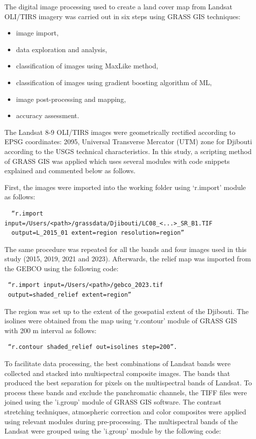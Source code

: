 \documentclass[jimaging,article,submit,pdftex,moreauthors]{Definitions/mdpi}
\begin{document}
The digital image processing used to create a land cover map from Landsat OLI/TIRS imagery was carried out in six steps using GRASS GIS techniques: 
\begin{itemize}
	\item image import, 
	\item data exploration and analysis, 
	\item classification of images using MaxLike method, 
	\item classification of images using gradient boosting algorithm of ML, 
	\item image post-processing and mapping,  
	\item accuracy assessment. 
\end{itemize}
The Landsat 8-9 OLI/TIRS images were geometrically rectified according to EPSG coordinates: 2095, Universal Transverse Mercator (UTM) zone for Djibouti according to the USGS technical characteristics. In this study, a scripting method of GRASS GIS was applied which uses several modules with code snippets explained and commented below as follows. 

First, the images were imported into the working folder using ‘r.import’ module as follows: 
\begin{verbatim}
  “r.import input=/Users/<path>/grassdata/Djibouti/LC08_<...>_SR_B1.TIF 
  output=L_2015_01 extent=region resolution=region”
\end{verbatim}
The same procedure was repeated for all the bands and four images used in this study (2015, 2019, 2021 and 2023). Afterwards, the relief map was imported from the GEBCO using the following code: 
\begin{verbatim}
 “r.import input=/Users/<path>/gebco_2023.tif 
 output=shaded_relief extent=region”
\end{verbatim}
The region was set up to the extent of the geospatial extent of the Djibouti. The isolines were obtained from the map using ‘r.contour’ module of GRASS GIS with 200 m interval as follows: 
\begin{verbatim}
 “r.contour shaded_relief out=isolines step=200”.
\end{verbatim}
 
To facilitate data processing, the best combinations of Landsat bands were collected and stacked into multispectral composite images. The bands that produced the best separation for pixels on the multispectral bands of Landsat. To process these bands and exclude the panchromatic channels, the TIFF files were joined using the 'i.group' module of GRASS GIS software. The contrast stretching techniques, atmospheric correction and color composites were applied using relevant modules during pre-processing. The multispectral bands of the Landsat were grouped using the 'i.group' module by the following code: 
\end{document}
